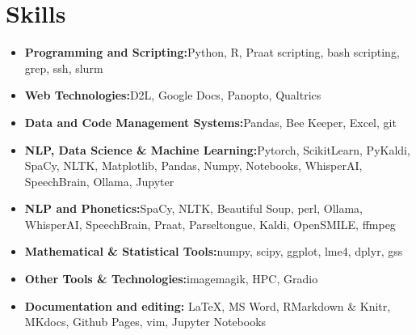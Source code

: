 \documentclass[a4paper,12pt]{article}
\makeatletter
\newcommand{\resumeItem}[2]{
  \item{
    \textbf{#1}{\hspace{0.5mm}#2 \vspace{-0.5mm}}
  }
}
\newcommand{\resumePOR}[3]{
\vspace{0.5mm}\item
    \begin{tabular*}{0.97\textwidth}[t]{l@{\extracolsep{\fill}}r}
        \textbf{#1}\hspace{0.3mm}#2 & \textit{\small{#3}} 
    \end{tabular*}
    \vspace{-2mm}
}
\newcommand{\resumeSubItem}[2]{\resumeItem{#1}{#2}\vspace{-4pt}}
\newcommand{\resumeSubHeadingListStart}{\begin{itemize}[leftmargin=*,labelsep=1mm]}
\newcommand{\resumeHeadingSkillStart}{\begin{itemize}[leftmargin=*,itemsep=1.7mm, rightmargin=2ex]}
\newcommand{\resumeSubHeadingListEnd}{\end{itemize}\vspace{2mm}}
\newcommand{\resumeHeadingSkillEnd}{\end{itemize}\vspace{-2mm}}
\makeatother
\begin{document}
\section{\textbf{Skills}}\label{skills}
\vspace{-0.4mm}
    \resumeHeadingSkillStart
        \resumeSubItem{Programming and Scripting:}
        {Python, R, Praat scripting, bash scripting, grep, ssh, slurm}
        \resumeSubItem{Web Technologies:}
        {D2L, Google Docs, Panopto, Qualtrics}
        \resumeSubItem{Data and Code Management Systems:}
        {Pandas, Bee Keeper, Excel, git }
        \resumeSubItem{NLP, Data Science \& Machine Learning:}
        {Pytorch, ScikitLearn, PyKaldi, SpaCy, NLTK, Matplotlib, Pandas, Numpy, Notebooks, WhisperAI, SpeechBrain, Ollama, Jupyter}
        \resumeSubItem{NLP and Phonetics:}
        {SpaCy, NLTK, Beautiful Soup, perl, Ollama, WhisperAI, SpeechBrain, Praat, Parseltongue, Kaldi, OpenSMILE, ffmpeg}
        \resumeSubItem{Mathematical \& Statistical Tools:}
        {numpy, scipy, ggplot, lme4, dplyr, gss }
        \resumeSubItem{Other Tools \& Technologies:}
        {imagemagik, HPC, Gradio}
        \resumeSubItem{Documentation and editing:}
        { \LaTeX, MS Word, RMarkdown \& Knitr, MKdocs, Github Pages, vim, Jupyter Notebooks}
    \resumeHeadingSkillEnd
\vspace{-3mm}



\end{document}
